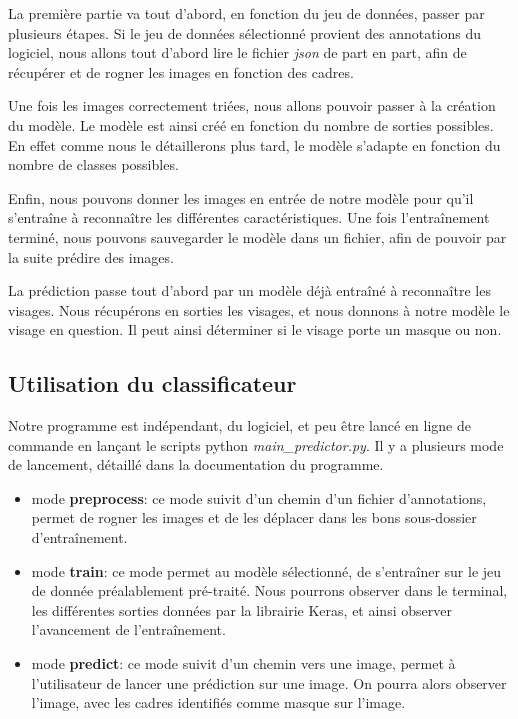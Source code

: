 \documentclass{rapport}
\begin{document}
            La première partie va tout d'abord, en fonction du jeu de données, passer par plusieurs étapes. Si le jeu de données sélectionné provient des annotations du logiciel, nous allons tout d'abord lire le fichier \textit{json} de part en part, afin de récupérer et de rogner les images en fonction des cadres.
            
            Une fois les images correctement triées, nous allons pouvoir passer à la création du modèle. Le modèle est ainsi créé en fonction du nombre de sorties possibles. En effet comme nous le détaillerons plus tard, le modèle s'adapte en fonction du nombre de classes possibles.
            
            Enfin, nous pouvons donner les images en entrée de notre modèle pour qu'il s'entraîne à reconnaître les différentes caractéristiques. Une fois l'entraînement terminé, nous pouvons sauvegarder le modèle dans un fichier, afin de pouvoir par la suite prédire des images.
            
            La prédiction passe tout d'abord par un modèle déjà entraîné à reconnaître les visages. Nous récupérons en sorties les visages, et nous donnons à notre modèle le visage en question. Il peut ainsi déterminer si le visage porte un masque ou non.
            
        \subsection{Utilisation du classificateur}
        
            Notre programme est indépendant, du logiciel, et peu être lancé en ligne de commande en lançant le scripts python \textit{main\_predictor.py}. Il y a plusieurs mode de lancement, détaillé dans la documentation du programme. 
            
            \begin{itemize}
                \item  mode \textbf{preprocess}\space: ce mode suivit d'un chemin d'un fichier d'annotations, permet de rogner les images et de les déplacer dans les bons sous-dossier d'entraînement.
                
                \item mode \textbf{train}\space: ce mode permet au modèle sélectionné, de s'entraîner sur le jeu de donnée préalablement pré-traité. Nous pourrons observer dans le terminal, les différentes sorties données par la librairie Keras, et ainsi observer l'avancement de l'entraînement.
                
                \item mode \textbf{predict}\space: ce mode suivit d'un chemin vers une image, permet à l'utilisateur de lancer une prédiction sur une image. On pourra alors observer l'image, avec les cadres identifiés comme masque sur l'image.
                
            \end{itemize}
           
\end{document}
